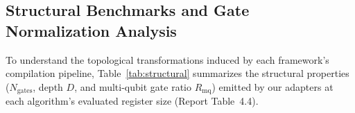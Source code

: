 \documentclass[runningheads]{llncs}
\begin{document}
\subsection{Structural Benchmarks and Gate Normalization Analysis}

To understand the topological transformations induced by each framework's compilation pipeline, Table~\ref{tab:structural} summarizes the structural properties ($N_{\text{gates}}$, depth $D$, and multi-qubit gate ratio $R_{\text{mq}}$) emitted by our adapters at each algorithm's evaluated register size (Report Table~4.4).

\begin{table}[htbp]
\centering
\caption{Structural benchmark summary across framework adapters at each algorithm's evaluated register size (Report Table~4.4). Shows Qubits ($n$), Total Gates ($N_{\text{gates}}$), Circuit Depth ($D$), and Multi-Qubit Ratio ($R_{\text{mq}}$).}
\label{tab:structural}
\renewcommand{\arraystretch}{1.15}
\setlength{\tabcolsep}{5.5pt}
\end{table}
\end{document}
